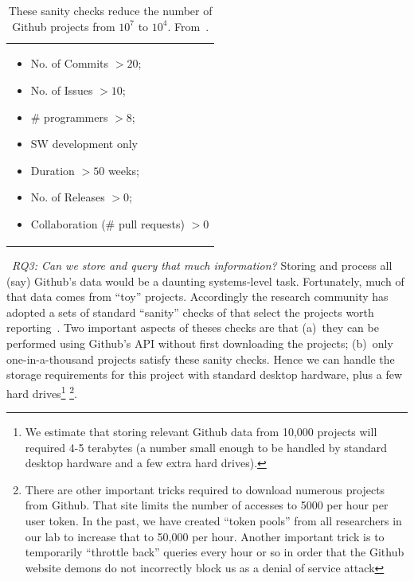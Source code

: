 \begin{table}
{\small
\begin{tabular}{p{2.1in}} 
\rowcolor{gray!20}\begin{itemize}[leftmargin=*]
\item
No. of Commits $> 20$;
\item
No. of Issues $> 10$;
\item
\# programmers $> 8$;
\item
SW development only 
\item Duration $> 50$ weeks;
\item
No. of Releases $> 0$; 
\item
Collaboration (\# pull requests) $> 0$
\end{itemize} 
\end{tabular}}
\caption{These sanity checks  reduce the number of
Github projects from $10^7$ to $10^4$.
From~\cite{5,21,29}.}\label{tbl:sanity}
\end{table} 
~{\em RQ3: Can we store and query that much information?}
Storing and process all (say) Github's data would be a daunting
systems-level task.  Fortunately, much of that data comes from   ``toy'' projects. Accordingly the research community has adopted a sets of standard ``sanity'' checks
of  that  select the projects worth reporting~\cite{5,21,29}.  
Two important aspects of theses checks are that
(a)~they can be performed using Github's API without
first downloading the projects; (b)~only one-in-a-thousand projects satisfy these sanity
checks. Hence we can handle the storage requirements
for this project with standard desktop hardware, plus a few  hard drives\footnote{We estimate that storing relevant Github data from 10,000 projects will required 4-5 terabytes (a number small enough to be handled by standard desktop hardware and a few extra hard drives).} \footnote{There are other
important tricks required to download numerous projects from Github. That site limits the number of accesses to 5000 per hour per user token. In the past, we have created ``token pools'' from all researchers in our lab to increase that to 50,000 per hour.
Another important trick is to temporarily
``throttle back'' queries every hour or so 
in order that the Github website demons do not incorrectly
block us as a denial of service attack}.



